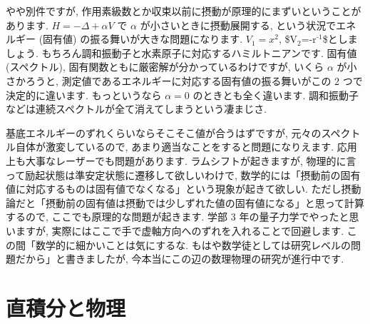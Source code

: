 \documentclass[openany, a4paper, oneside]{jsbook}
\begin{document}
やや別件ですが, 作用素級数とか収束以前に摂動が原理的にまずいということがあります.
$H = - \Delta + \alpha V$ で $\alpha$ が小さいときに摂動展開する,
という状況でエネルギー (固有値) の振る舞いが大きな問題になります.
$V_1 = x^2$, \$V$_{\text{2}}$=-r$^{\text{-1}}$\$としましょう.
もちろん調和振動子と水素原子に対応するハミルトニアンです.
固有値 (スペクトル), 固有関数ともに厳密解が分かっているわけですが,
いくら $\alpha$ が小さかろうと, 測定値であるエネルギーに対応する固有値の振る舞いがこの 2 つで決定的に違います.
もっというなら $\alpha = 0$ のときとも全く違います.
調和振動子などは連続スペクトルが全て消えてしまうという凄まじさ.

基底エネルギーのずれくらいならそこそこ値が合うはずですが,
元々のスペクトル自体が激変しているので, あまり適当なことをすると問題になりえます.
応用上も大事なレーザーでも問題があります.
ラムシフトが起きますが, 物理的に言って励起状態は準安定状態に遷移して欲しいわけで,
数学的には「摂動前の固有値に対応するものは固有値でなくなる」という現象が起きて欲しい.
ただし摂動論だと「摂動前の固有値は摂動では少しずれた値の固有値になる」と思って計算するので, ここでも原理的な問題が起きます.
学部 3 年の量子力学でやったと思いますが, 実際にはここで手で虚軸方向へのずれを入れることで回避します.
この間「数学的に細かいことは気にするな.
もはや数学徒としては研究レベルの問題だから」と書きましたが,
今本当にこの辺の数理物理の研究が進行中です.
\chapter{直積分と物理}
\end{document}
